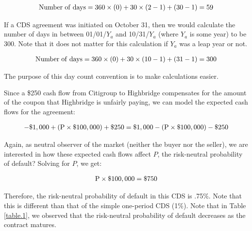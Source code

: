 \documentclass{jss}
\begin{document}
\begin{equation}
 \begin{aligned}
  {\rm Number\hspace{3pt}of\hspace{3pt}days = 360 \times (0) + 30 \times (2 - 1) + (30 - 1) = 59}
    \end{aligned}
\end{equation}

If a CDS agreement was initiated on October 31, then we would calculate the number of days in between 01/01/$Y_a$ and 10/31/$Y_a$ (where $Y_a$ is some year) to be 300. Note that it does not matter for this calculation if $Y_a$ was a leap year or not.

\begin{equation}
 \begin{aligned}
  {\rm Number\hspace{3pt}of\hspace{3pt}days = 360 \times (0) + 30 \times (10 - 1) + (31 - 1) = 300}
    \end{aligned}
\end{equation}

The purpose of this day count convention is to make calculations easier.

Since a \$250 cash flow from Citigroup to Highbridge compensates for the amount of the coupon that Highbridge is unfairly paying, we can model the expected cash flows for the agreement:

\begin{equation}
 \begin{aligned}
   {\rm - \$1,000 + (P \times \$100,000) + \$250 = \$1,000 - (P \times \$100,000) - \$250}
    \end{aligned}
\end{equation}

Again, as neutral observer of the market (neither the buyer nor the seller), we are interested in how these expected cash flows affect $P$, the risk-neutral probability of default? Solving for $P$, we get:

\begin{equation}
 \begin{aligned}
   {\rm P \times \$100,000 = \$750}
    \end{aligned}
\end{equation}

Therefore, the risk-neutral probability of default in this CDS is .75\%. Note that this is different than that of the simple one-period CDS (1\%). Note that in Table \ref{table.1}, we observed that the risk-neutral probability of default decreases as the contract matures. 
\end{document}
